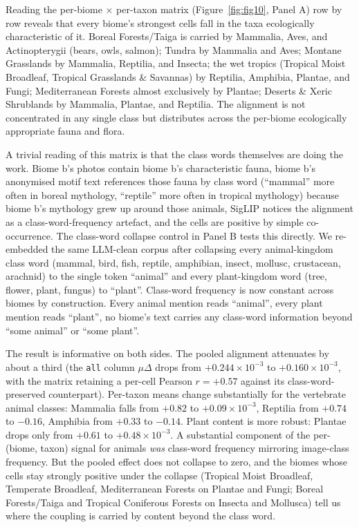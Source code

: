 \documentclass[11pt,a4paper]{article}
\begin{document}
Reading the per-biome × per-taxon matrix (Figure~\ref{fig:fig10},
Panel A) row by row reveals that every biome's strongest cells
fall in the taxa ecologically characteristic of it. Boreal
Forests/Taiga is carried by Mammalia, Aves, and Actinopterygii
(bears, owls, salmon); Tundra by Mammalia and Aves; Montane
Grasslands by Mammalia, Reptilia, and Insecta; the wet tropics
(Tropical Moist Broadleaf, Tropical Grasslands \& Savannas) by
Reptilia, Amphibia, Plantae, and Fungi; Mediterranean Forests
almost exclusively by Plantae; Deserts \& Xeric Shrublands by
Mammalia, Plantae, and Reptilia. The alignment is not
concentrated in any single class but distributes across the
per-biome ecologically appropriate fauna and flora.

A trivial reading of this matrix is that the class words
themselves are doing the work. Biome b's photos contain biome
b's characteristic fauna, biome b's anonymised motif text
references those fauna by class word (``mammal'' more often in
boreal mythology, ``reptile'' more often in tropical mythology)
because biome b's mythology grew up around those animals, SigLIP
notices the alignment as a class-word-frequency artefact, and the
cells are positive by simple co-occurrence. The class-word
collapse control in Panel B tests this directly. We re-embedded
the same LLM-clean corpus after collapsing every animal-kingdom
class word (mammal, bird, fish, reptile, amphibian, insect,
mollusc, crustacean, arachnid) to the single token ``animal'' and
every plant-kingdom word (tree, flower, plant, fungus) to
``plant''. Class-word frequency is now constant across biomes by
construction. Every animal mention reads ``animal'', every plant
mention reads ``plant'', no biome's text carries any class-word
information beyond ``some animal'' or ``some plant''.

The result is informative on both sides. The pooled alignment
attenuates by about a third (the \texttt{all} column $\mu\Delta$
drops from $+0.244\times 10^{-3}$ to $+0.160\times 10^{-3}$, with
the matrix retaining a per-cell Pearson $r = +0.57$ against its
class-word-preserved counterpart). Per-taxon means change
substantially for the vertebrate animal classes: Mammalia falls
from $+0.82$ to $+0.09 \times 10^{-3}$, Reptilia from $+0.74$ to
$-0.16$, Amphibia from $+0.33$ to $-0.14$. Plant content is more
robust: Plantae drops only from $+0.61$ to $+0.48 \times 10^{-3}$.
A substantial component of the per-(biome, taxon) signal for
animals \emph{was} class-word frequency mirroring image-class
frequency. But the pooled effect does not collapse to zero, and
the biomes whose cells stay strongly positive under the collapse
(Tropical Moist Broadleaf, Temperate Broadleaf, Mediterranean
Forests on Plantae and Fungi; Boreal Forests/Taiga and Tropical
Coniferous Forests on Insecta and Mollusca) tell us where the
coupling is carried by content beyond the class word.
\end{document}
